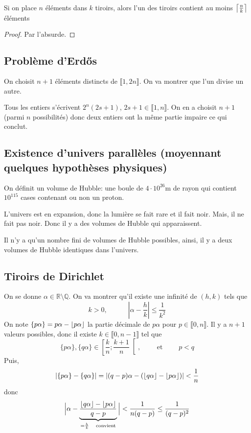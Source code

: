 \begin{prop}
    Si on place $n$ éléments dans $k$ tiroirs, alors l'un des tiroirs contient au moins $\left\lceil\frac nk\right\rceil$ éléments
\end{prop}

\begin{proof}
    Par l'absurde.
\end{proof}

\subsection{Problème d'Erdős}

On choisit $n+1$ éléments distincts de $\llbracket 1, 2n\rrbracket$. On va montrer que l'un divise un autre.

Tous les entiers s'écrivent $2^n(2s+1)$, $2s+1\in\llbracket 1, n\rrbracket$. On en a choisit $n+1$ (parmi $n$ possibilités) donc deux entiers ont la même partie impaire ce qui conclut.

\subsection{Existence d'univers parallèles (moyennant quelques hypothèses physiques)}

On définit un volume de Hubble: une boule de $4\cdot 10^{26}$m de rayon qui contient $10^{115}$ cases contenant ou non un proton.

L'univers est en expansion, donc la lumière se fait rare et il fait noir. Mais, il ne fait pas noir. Donc il y a des volumes de Hubble qui apparaissent.

Il n'y a qu'un nombre fini de volumes de Hubble possibles, ainsi, il y a deux volumes de Hubble identiques dans l'univers.

\subsection{Tiroirs de Dirichlet}

On se donne $\alpha\in\mathbb R\setminus \mathbb Q$. On va montrer qu'il existe une infinité de $(h, k)$ tels que \[
    k>0,\qquad \quad \left| \alpha-\frac hk \right|\leq \frac1{k^2}
\]
On note $\{p\alpha\}=p\alpha-\left\lfloor p\alpha\right\rfloor$ la partie décimale de $p\alpha$ pour $p\in\llbracket 0, n\rrbracket$. Il y a $n+1$ valeurs possibles, donc il existe $k\in\llbracket 0, n-1\rrbracket$ tel que \[
    \{p\alpha\}, \{q\alpha\}\in \left[ \frac kn;\frac {k+1}n \right[,\qquad \text{ et }\qquad p<q
\]
Puis, \[
    |\{p\alpha\}-\{q\alpha\}|=|(q-p)\alpha-(\left\lfloor q\alpha\right\rfloor-\left\lfloor p\alpha\right\rfloor)|<\frac1n
\]
donc \[
    \Big|\alpha-\underbrace{\frac{\left\lfloor q\alpha\right\rfloor-\left\lfloor p\alpha\right\rfloor}{q-p}}_{=\frac hk\quad \text{convient}}\Big|<\frac1{n(q-p)}\leq \frac1{(q-p)^2}
\]

